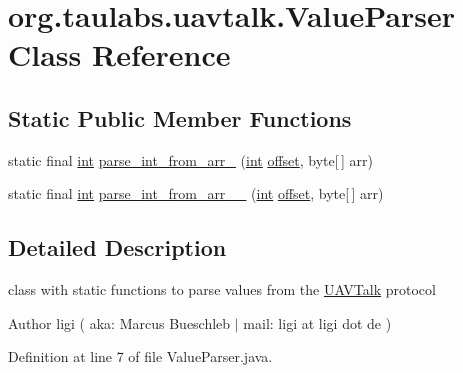 \hypertarget{classorg_1_1taulabs_1_1uavtalk_1_1_value_parser}{\section{org.\-taulabs.\-uavtalk.\-Value\-Parser Class Reference}
\label{classorg_1_1taulabs_1_1uavtalk_1_1_value_parser}
}
\subsection*{Static Public Member Functions}
\begin{DoxyCompactItemize}
\item 
static final \hyperlink{ioapi_8h_a787fa3cf048117ba7123753c1e74fcd6}{int} \hyperlink{classorg_1_1taulabs_1_1uavtalk_1_1_value_parser_a6ac48b02167a5c46bb81b6472f187bd7}{parse\-\_\-int\-\_\-from\-\_\-arr\-\_} (\hyperlink{ioapi_8h_a787fa3cf048117ba7123753c1e74fcd6}{int} \hyperlink{glext_8h_ae1b92ae085ddef4b1cdca7d749339fb0}{offset}, byte\mbox{[}$\,$\mbox{]} arr)
\item 
static final \hyperlink{ioapi_8h_a787fa3cf048117ba7123753c1e74fcd6}{int} \hyperlink{classorg_1_1taulabs_1_1uavtalk_1_1_value_parser_a478c3605dbdc23b380cfdc8431a50f4e}{parse\-\_\-int\-\_\-from\-\_\-arr\-\_\-\_} (\hyperlink{ioapi_8h_a787fa3cf048117ba7123753c1e74fcd6}{int} \hyperlink{glext_8h_ae1b92ae085ddef4b1cdca7d749339fb0}{offset}, byte\mbox{[}$\,$\mbox{]} arr)
\end{DoxyCompactItemize}


\subsection{Detailed Description}
class with static functions to parse values from the \hyperlink{class_u_a_v_talk}{U\-A\-V\-Talk} protocol

\begin{DoxyAuthor}{Author}
ligi ( aka\-: Marcus Bueschleb $|$ mail\-: ligi at ligi dot de ) 
\end{DoxyAuthor}


Definition at line 7 of file Value\-Parser.\-java.




